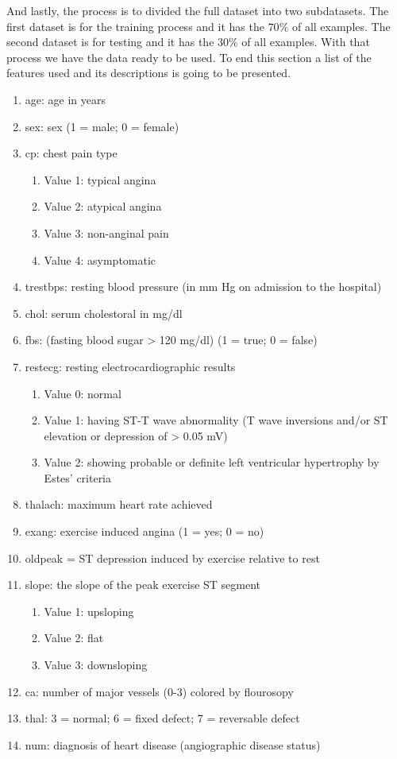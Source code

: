 \documentclass[12pt]{article}
\begin{document}
And lastly, the process is to divided the full dataset into two subdatasets. The first dataset is for the training process and it has the $70\%$ of all examples. The second dataset is for testing and it has the $30\%$ of all examples.
With that process we have the data ready to be used. To end this section a list of the features used and its descriptions is going to be presented.
 \begin{multicols}{2}
\begin{enumerate} 
	\item age: age in years 
	\item sex: sex (1 = male; 0 = female)
	\item cp: chest pain type 
	\begin{enumerate} 
		\item Value 1: typical angina 
		\item Value 2: atypical angina 
		\item Value 3: non-anginal pain 
		\item Value 4: asymptomatic 
	\end{enumerate}
	\item trestbps: resting blood pressure (in mm Hg on admission to the hospital) 
	\item chol: serum cholestoral in mg/dl 
	\item fbs: (fasting blood sugar > 120 mg/dl) (1 = true; 0 = false) 
	\item restecg: resting electrocardiographic results 
	\begin{enumerate} 
		\item Value 0: normal 
		\item Value 1: having ST-T wave abnormality (T wave inversions and/or ST elevation or depression of > 0.05 mV)  
		\item Value 2: showing probable or definite left ventricular hypertrophy by Estes' criteria 
	\end{enumerate}
	\item thalach: maximum heart rate achieved 
	\item exang: exercise induced angina (1 = yes; 0 = no)
	\item oldpeak = ST depression induced by exercise relative to rest 
	\item slope: the slope of the peak exercise ST segment 
	\begin{enumerate} 
		\item Value 1: upsloping 
		\item Value 2: flat   
		\item Value 3: downsloping 
	\end{enumerate}
	\item ca: number of major vessels (0-3) colored by flourosopy
	\item thal: 3 = normal; 6 = fixed defect; 7 = reversable defect
	\item num: diagnosis of heart disease (angiographic disease status)
\end{enumerate}
\end{multicols}
\end{document}

